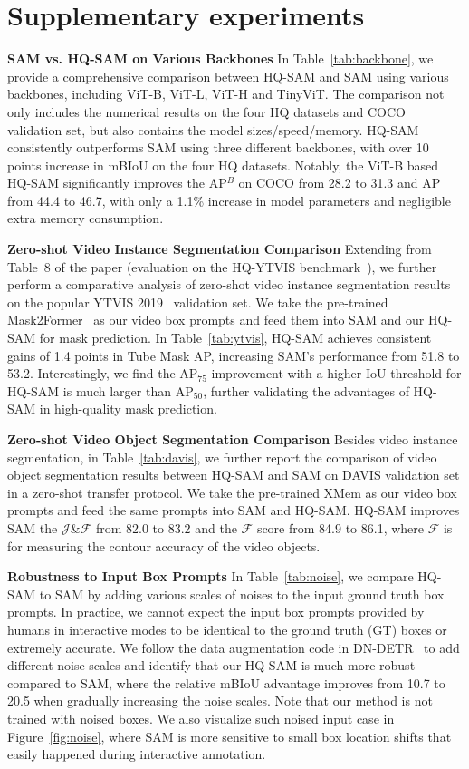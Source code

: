 \section{Supplementary experiments}
\label{sec:more_exp}

\textbf{SAM vs. HQ-SAM on Various Backbones}  In Table~\ref{tab:backbone}, we provide a comprehensive comparison between HQ-SAM and SAM using various backbones, including ViT-B, ViT-L, ViT-H and TinyViT. The comparison not only includes the numerical results on the four HQ datasets and COCO validation set, but also contains the model sizes/speed/memory. HQ-SAM consistently outperforms SAM using three different backbones, with over 10 points increase in mBIoU on the four HQ datasets. Notably, the ViT-B based HQ-SAM significantly improves the AP$^B$ on COCO from 28.2 to 31.3 and AP from 44.4 to 46.7, with only a 1.1\% increase in model parameters and negligible extra memory consumption.

\textbf{Zero-shot Video Instance Segmentation Comparison}  Extending from Table~8 of the paper (evaluation on the HQ-YTVIS benchmark~\cite{vmt}), we further perform a comparative analysis of zero-shot video instance segmentation results on the popular YTVIS 2019~\cite{yang2019video} validation set. We take the pre-trained Mask2Former~\cite{cheng2021mask2former} as our video box prompts and feed them into SAM and our HQ-SAM for mask prediction. In Table~\ref{tab:ytvis}, HQ-SAM achieves consistent gains of 1.4 points in Tube Mask AP, increasing SAM's performance from 51.8 to 53.2. Interestingly, we find the AP$_{75}$ improvement with a higher IoU threshold for HQ-SAM is much larger than AP$_{50}$, further validating the advantages of HQ-SAM in high-quality mask prediction.

\textbf{Zero-shot Video Object Segmentation Comparison}  Besides video instance segmentation, in Table~\ref{tab:davis}, we further report the comparison of video object segmentation results  between HQ-SAM and SAM on DAVIS validation set in a zero-shot transfer protocol. We take the pre-trained XMem as our video box prompts and feed the same prompts into SAM and HQ-SAM. HQ-SAM improves SAM the $\mathcal{J\&F}$ from 82.0 to 83.2 and the $\mathcal{F}$ score from 84.9 to 86.1, where $\mathcal{F}$ is for measuring the contour accuracy of the video objects.

\textbf{Robustness to Input Box Prompts}  In Table~\ref{tab:noise}, we compare HQ-SAM to SAM by adding various scales of noises to the input ground truth box prompts. In practice, we cannot expect the input box prompts provided by humans in interactive modes to be identical to the ground truth (GT) boxes or extremely accurate. We follow the data augmentation code in DN-DETR~\cite{li2022dn} to add different noise scales and identify that our HQ-SAM is much more robust compared to SAM, where the relative mBIoU advantage improves from 10.7 to 20.5 when gradually increasing the noise scales. Note that our method is not trained with noised boxes. We also visualize such noised input case in Figure~\ref{fig:noise}, where SAM is more sensitive to small box location shifts that easily happened during interactive annotation.

